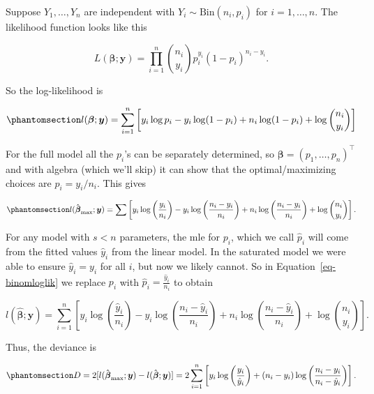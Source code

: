 \documentclass[
  a4paper,
  DIV=11,
  numbers=noendperiod]{scrreprt}
\newenvironment{fbxSimple}[3]{\begin{tcolorbox}[enhanced, breakable,%
attach boxed title to top*={xshift=1.4pt},
boxed title style={boxrule=0.0mm, fuzzy shadow={1pt}{-1pt}{0mm}{0.1mm}{gray}, arc=.3em, rounded corners=east, sharp corners=west}, colframe=#1-color2, colbacktitle=#1-color1, colback = white, coltitle=black,  titlerule=0mm, toprule=0pt, bottomrule=.7pt, leftrule=.3em, rightrule=.7pt, outer arc=.3em,  	left=.5em, right=.5em, bottomtitle=1mm, toptitle=1mm,title=\textbf{#2}\hspace{0.5em}{#3}]}
{\end{tcolorbox}}
\begin{document}
\begin{fbxSimple}{Example}{Example 9: }{Deviance for a binomial model}
\label{deviance-for-a-binomial-model}
Suppose \(Y_1, \dots, Y_n\) are independent with
\(Y_i \sim \mathrm{Bin}(n_i, p_i)\) for \(i=1,\dots, n\). The likelihood
function looks like this

\[
L(\boldsymbol{\beta}; \boldsymbol{y}) = \prod_{i=1}^n \binom{n_i}{y_i} p_i^{y_i} (1 - p_i)^{n_i - y_i}.
\]

So the log-likelihood is

\begin{equation}\phantomsection\label{eq-binomloglik}{
l(\boldsymbol{\beta}; \boldsymbol{y}) = \sum_{i=1}^n \left[y_i \log p_i-y_i \log(1-p_i)+ n_i \log(1-p_i) +\log \binom{n_i}{y_i} \right]
}\end{equation}

For the full model all the \(p_i\)'s can be separately determined, so
\(\boldsymbol{\beta}=(p_1, \dots, p_n)^\intercal\) and with algebra
(which we'll skip) it can show that the optimal/maximizing choices are
\(\hat{p}_i=y_i/n_i\). This gives

\begin{equation}\phantomsection\label{eq-binomloglikfullmodel}{
l(\hat{\boldsymbol{\beta}}_{\max}; \boldsymbol{y}) = \sum \left[y_i \log \left(\frac{y_i}{n_i}\right)-y_i \log\left(\frac{n_i-y_i}{n_i}\right) + n_i \log\left(\frac{n_i-y_i}{n_i}\right) +\log \binom{n_i}{y_i} \right].
}\end{equation}

For any model with \(s<n\) parameters, the mle for \(p_i\), which we
call \(\hat{p}_i\) will come from the fitted values \(\hat{y}_i\) from
the linear model. In the saturated model we were able to ensure
\(\hat{y}_i=y_i\) for all \(i\), but now we likely cannot. So in
Equation~\ref{eq-binomloglik} we replace \(p_i\) with
\(\hat{p}_i = \frac{\hat{y}_i}{n_i}\) to obtain

\[
l(\hat{\boldsymbol{\beta}}; \boldsymbol{y}) = \sum_{i=1}^n \left[y_i \log \left(\frac{\hat{y}_i}{n_i}\right)-y_i \log\left(\frac{n_i-\hat{y}_i}{n_i}\right)+n_i \log\left(\frac{n_i-\hat{y}_i}{n_i}\right) +\log \binom{n_i}{y_i} \right].
\]

Thus, the deviance is

\begin{equation}\phantomsection\label{eq-binomdev}{
D = 2[ l(\hat{\boldsymbol{\beta}}_{\max};\boldsymbol{y})-l(\hat{\boldsymbol{\beta}};\boldsymbol{y})]= 2\sum_{i=1}^n \left[ y_i \log\left(\frac{y_i}{\hat{y}_i}\right)+ (n_i - y_i)  \log\left(\frac{n_i-y_i}{n_i-\hat{y}_i}\right) \right].
}\end{equation}

\end{fbxSimple}
\end{document}
